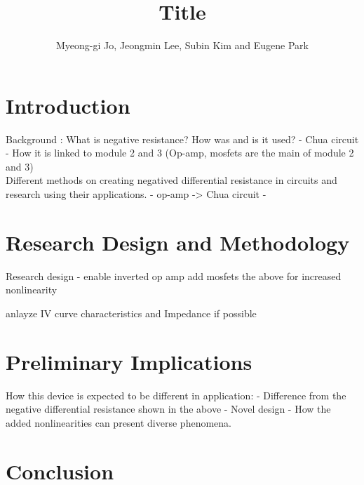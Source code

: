 \documentclass[10pt]{article}
\begin{document}
\title{Title}
\author{Myeong-gi Jo, Jeongmin Lee, Subin Kim and Eugene Park}

\maketitle

\section{Introduction}
Background : What is negative resistance?
How was and is it used?
- Chua circuit
- 
How it is linked to module 2 and 3 (Op-amp, mosfets are the main of module 2 and 3)
\\
Different methods on creating negatived differential resistance in circuits and research using their applications.
- op-amp -> Chua circuit
- 
\section{Research Design and Methodology}
Research design - enable inverted op amp
add mosfets the above for increased nonlinearity

anlayze IV curve characteristics and Impedance if possible

\section{Preliminary Implications}
How this device is expected to be different in application:
- Difference from the negative differential resistance shown in the above
- Novel design
- How the added nonlinearities can present diverse phenomena.
\section{Conclusion}
\end{document}
